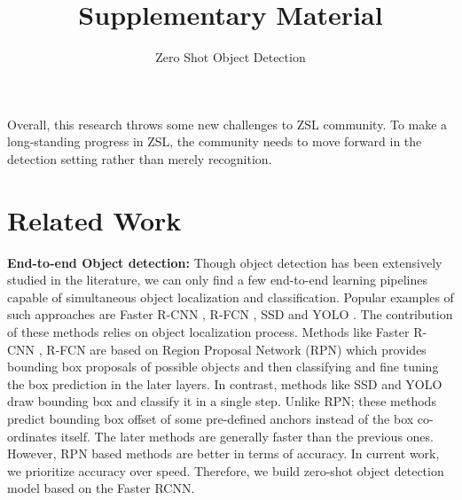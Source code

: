 \documentclass[runningheads]{llncs}
\begin{document}
Overall, this research throws some new challenges to ZSL community. To make a long-standing progress in ZSL, the community needs to move forward in the detection setting rather than merely recognition. 
 
{\small


}



\title{Supplementary Material}
\author{\large Zero Shot Object Detection}
\institute{}
\maketitle
\def\thesection{\Alph{section}.}
\renewcommand\thesubsection{\Alph{section}.\arabic{subsection}}

\section{Related Work} \label{sec:related_work}
\textbf{End-to-end Object detection:}  Though object detection has been extensively studied in the literature, we can only find a few end-to-end learning pipelines capable of simultaneous object localization and classification. Popular examples of such approaches are Faster R-CNN \cite{Faster_RCNN_2017}, R-FCN \cite{Dai_RFCN_2016}, SSD \cite{Liu_SSD_2016} and YOLO \cite{Redmon_yolo9000_2016}. The contribution of these methods relies on object localization process. Methods like Faster R-CNN \cite{Faster_RCNN_2017}, R-FCN \cite{Dai_RFCN_2016} are based on Region Proposal Network (RPN) which provides bounding box proposals of possible objects and then classifying and fine tuning the box prediction in the later layers. In contrast, methods like SSD \cite{Liu_SSD_2016} and YOLO \cite{Redmon_yolo9000_2016} draw bounding box and classify it in a single step. Unlike RPN; these methods predict bounding box offset of some pre-defined anchors instead of the box co-ordinates itself. The later methods are generally faster than the previous ones. However, RPN based methods are better in terms of accuracy. In current work, we prioritize accuracy over speed. Therefore, we build zero-shot object detection model based on the Faster RCNN.
\end{document}
